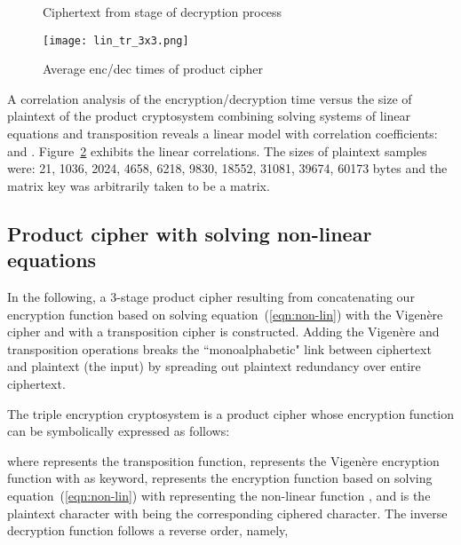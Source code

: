 \documentclass[10pt,journal]{IEEEtran}
\begin{document}
\begin{figure}[H]
\centering 
{}
\caption{Ciphertext from  stage of decryption process}
\label{fig:champions_lin_dec}
\end{figure}

\begin{figure}[H]
\centering
\texttt{[image: lin\_tr\_3x3.png]}
\caption{Average enc/dec times of product cipher}
\label{fig:lin_tr_3x3}
\end{figure}

A correlation analysis of the encryption/decryption time versus the
size of plaintext of the product cryptosystem combining solving
systems of linear equations and transposition reveals a linear model
with correlation coefficients:  and . Figure~\ref{fig:lin_tr_3x3} exhibits the linear correlations.
The sizes of plaintext samples were: 21, 1036, 2024, 4658, 6218, 9830,
18552, 31081, 39674, 60173 bytes and the matrix key was arbitrarily
taken to be a  matrix.

\subsection{Product cipher with solving non-linear equations}
\label{ssec:product_cipher_non_lin_eqns}
In the following, a 3-stage product cipher resulting from
concatenating our encryption function based on solving
equation~(\ref{eqn:non-lin}) with the Vigen\`ere cipher and with a
transposition cipher is constructed. Adding the Vigen\`ere and
transposition operations breaks the ``monoalphabetic" link between
ciphertext and plaintext (the input) by spreading out plaintext
redundancy over entire ciphertext.
\newline

The triple encryption cryptosystem is a product cipher whose
encryption function can be symbolically expressed as follows:


  
\noindent where  represents the transposition function,
 represents the Vigen\`ere encryption function with
 as keyword,  represents the encryption function
based on solving equation~(\ref{eqn:non-lin}) with 
representing the non-linear function , and  is the 
plaintext character with  being the corresponding ciphered
character. The inverse decryption function follows a reverse order,
namely,
\end{document}

